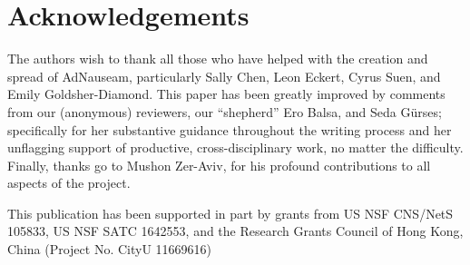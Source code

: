 \documentclass[conference]{IEEEtran}
\begin{document}
\section*{Acknowledgements}
The authors wish to thank all those who have helped with the creation and spread of AdNauseam, particularly Sally Chen, Leon Eckert, Cyrus Suen, and Emily Goldsher-Diamond. This paper has been greatly improved by comments from our (anonymous) reviewers, our “shepherd” Ero Balsa, and Seda G\"urses; specifically for her substantive guidance throughout the writing process and her unflagging support of productive, cross-disciplinary work, no matter the difficulty. Finally, thanks go to Mushon Zer-Aviv, for his profound contributions to all aspects of the project.

This publication has been supported in part by grants from US NSF CNS/NetS 105833, US NSF SATC 1642553, and the Research Grants Council of Hong Kong, China (Project No. CityU 11669616)
\end{document}
